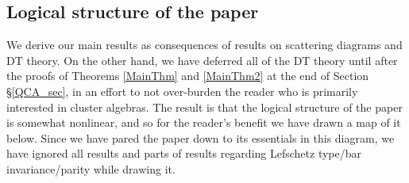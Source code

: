 \documentclass{amsart}
\theoremstyle{plain}%
\theoremstyle{definition}
\theoremstyle{remark}
\begin{document}
\subsection{Logical structure of the paper}
We derive our main results as consequences of results on scattering diagrams and DT theory.  On the other hand, we have deferred all of the DT theory until after the proofs of Theorems \ref{MainThm} and \ref{MainThm2} at the end of Section \S \ref{QCA_sec}, in an effort to not over-burden the reader who is primarily interested in cluster algebras.  The result is that the logical structure of the paper is somewhat nonlinear, and so for the reader's benefit we have drawn a map of it below.  Since we have pared the paper down to its essentials in this diagram, we have ignored all results and parts of results regarding Lefschetz type/bar invariance/parity while drawing it.
\end{document}
